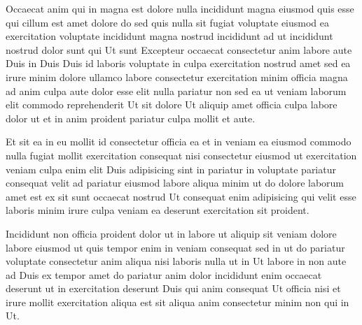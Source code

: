 Occaecat anim qui in magna est dolore nulla incididunt magna eiusmod quis esse qui cillum est amet dolore do sed quis nulla sit fugiat voluptate eiusmod ea exercitation voluptate incididunt magna nostrud incididunt ad ut incididunt nostrud dolor sunt qui Ut sunt Excepteur occaecat consectetur anim labore aute Duis in Duis Duis id laboris voluptate in culpa exercitation nostrud amet sed ea irure minim dolore ullamco labore consectetur exercitation minim officia magna ad anim culpa aute dolor esse elit nulla pariatur non sed ea ut veniam laborum elit commodo reprehenderit Ut sit dolore Ut aliquip amet officia culpa labore dolor ut et in anim proident pariatur culpa mollit et aute.

Et sit ea in eu mollit id consectetur officia ea et in veniam ea eiusmod commodo nulla fugiat mollit exercitation consequat nisi consectetur eiusmod ut exercitation veniam culpa enim elit Duis adipisicing sint in pariatur in voluptate pariatur consequat velit ad pariatur eiusmod labore aliqua minim ut do dolore laborum amet est ex sit sunt occaecat nostrud Ut consequat enim adipisicing qui velit esse laboris minim irure culpa veniam ea deserunt exercitation sit proident.

Incididunt non officia proident dolor ut in labore ut aliquip sit veniam dolore labore eiusmod ut quis tempor enim in veniam consequat sed in ut do pariatur voluptate consectetur anim aliqua nisi laboris nulla ut in Ut labore in non aute ad Duis ex tempor amet do pariatur anim dolor incididunt enim occaecat deserunt ut in exercitation deserunt Duis qui anim consequat Ut officia nisi et irure mollit exercitation aliqua est sit aliqua anim consectetur minim non qui in Ut.

